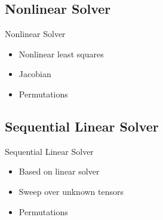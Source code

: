 

\subsection{Nonlinear Solver}
\begin{frame}{Nonlinear Solver}
    \begin{itemize}
        \item Nonlinear least squares
        \item Jacobian
        \item Permutations
    \end{itemize}
\end{frame}

\subsection{Sequential Linear Solver}
\begin{frame}{Sequential Linear Solver}
    \begin{itemize}
        \item Based on linear solver
        \item Sweep over unknown tensors
        \item Permutations
    \end{itemize}
\end{frame}